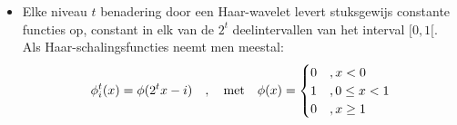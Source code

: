 \begin{enumerate}
{\begin{itemize}
		\end{itemize}}
			
	{
		\begin{itemize}
			\item Elke niveau $t$ benadering door een Haar-wavelet levert stuksgewijs constante functies op, constant in elk van de $2^t$ deelintervallen van het interval $[0, 1[$. Als Haar-schalingsfuncties neemt men meestal:
		$$\phi_i^t(x) = \phi(2^tx - i)\quad,\quad\hbox{met}\quad \phi(x) = 
			\begin{cases}
				0 &, x < 0 \\
				1 &, 0 \leq x < 1 \\
				0 &, x \geq 1
			\end{cases}$$


\end{itemize}}
\end{enumerate}
